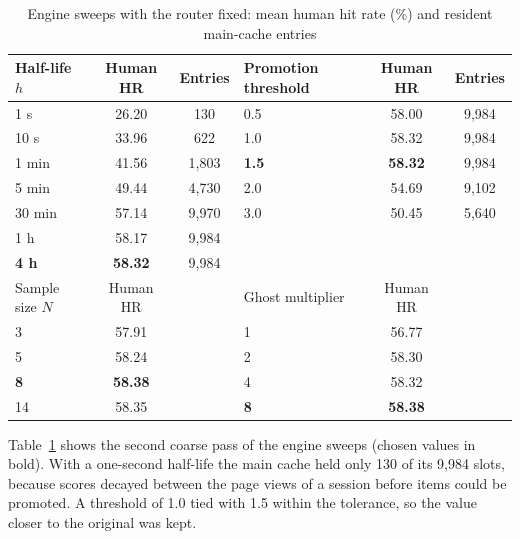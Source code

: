 \begin{table}[htbp]
    \centering
    \caption{Engine sweeps with the router fixed: mean human hit rate (\%) and resident main-cache entries}
    \label{tab:app-engine-sweeps}
    \small
    \begin{tabular}{lcc@{\hspace{2em}}lcc}
        \toprule
        Half-life $h$ & Human HR & Entries & Promotion threshold & Human HR & Entries \\
        \midrule
        1 s & 26.20 & 130 & 0.5 & 58.00 & 9{,}984 \\
        10 s & 33.96 & 622 & 1.0 & 58.32 & 9{,}984 \\
        1 min & 41.56 & 1{,}803 & \textbf{1.5} & \textbf{58.32} & 9{,}984 \\
        5 min & 49.44 & 4{,}730 & 2.0 & 54.69 & 9{,}102 \\
        30 min & 57.14 & 9{,}970 & 3.0 & 50.45 & 5{,}640 \\
        1 h & 58.17 & 9{,}984 & & & \\
        \textbf{4 h} & \textbf{58.32} & 9{,}984 & & & \\
        \midrule
        Sample size $N$ & Human HR & & Ghost multiplier & Human HR & \\
        \midrule
        3 & 57.91 & & 1 & 56.77 & \\
        5 & 58.24 & & 2 & 58.30 & \\
        \textbf{8} & \textbf{58.38} & & 4 & 58.32 & \\
        14 & 58.35 & & \textbf{8} & \textbf{58.38} & \\
        \bottomrule
    \end{tabular}
\end{table}

Table~\ref{tab:app-engine-sweeps} shows the second coarse pass of the engine sweeps (chosen values in bold). With a one-second half-life the main cache held only 130 of its 9{,}984 slots, because scores decayed between the page views of a session before items could be promoted. A threshold of 1.0 tied with 1.5 within the tolerance, so the value closer to the original was kept.

